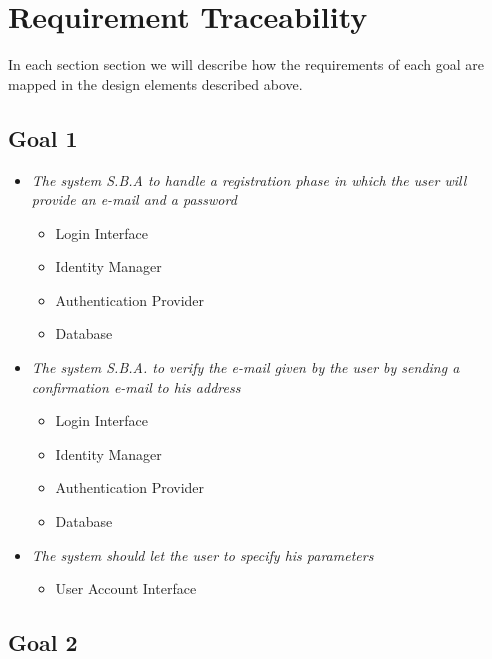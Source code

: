 \chapter{Requirement Traceability}
In each section section we will describe how the requirements of each goal are mapped in the design elements described above.

\section{Goal 1}

\begin{itemize}

\item \textit{The system S.B.A to handle a registration phase in 
which the user will provide an e-mail and a password}

\begin{itemize}
\item Login Interface
\item Identity Manager
\item Authentication Provider
\item Database
\end{itemize}

\item \textit{The system S.B.A. to verify the e-mail given by the user by sending a confirmation e-mail to his address}

\begin{itemize}
\item Login Interface
\item Identity Manager
\item Authentication Provider
\item Database
\end{itemize}

\item \textit{The system should let the user to specify his parameters}

\begin{itemize}
\item User Account Interface
\end{itemize}

\end{itemize} 


\section{Goal 2}


